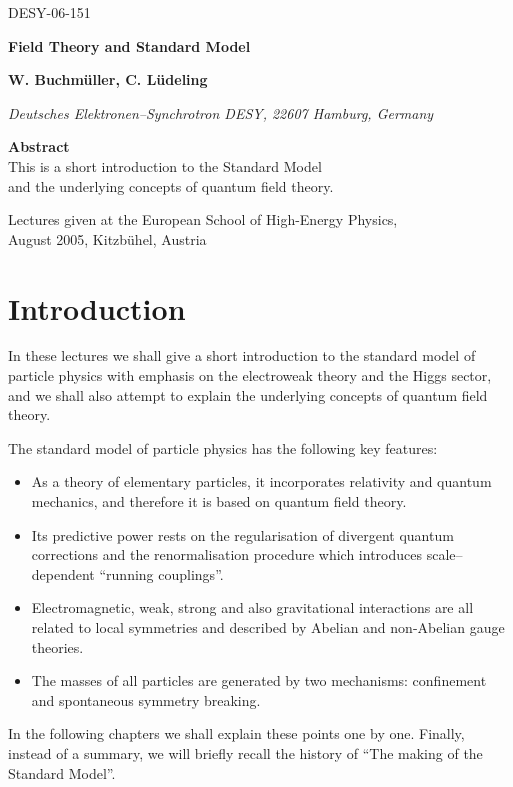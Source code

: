 \documentclass[12pt]{report}
\newcommand{\2}{\ensuremath{\sqrt{2}\,}}
\begin{document}
  \begin{titlepage}
    \hspace*{\fill}DESY-06-151

    \begin{center}
      \vspace{5cm}
      {\Huge \bfseries Field Theory and Standard Model}

      \vspace{2cm}
      {\bfseries\large W. Buchm\"{u}ller, C. L\"{u}deling}

      \vspace{1cm}
      {\it\large  Deutsches Elektronen--Synchrotron DESY, 22607 Hamburg, Germany}

      
      \vspace{2cm}
      {\bfseries Abstract}\\ 
      This is a short introduction to the Standard Model\\ 
      and the underlying concepts of quantum field theory.
 

      \vfill
      Lectures given at the European School of High-Energy Physics,\\
      August 2005, Kitzb\"{u}hel, Austria 

    \end{center}
  \end{titlepage}


  \tableofcontents

  \chapter{Introduction}
  
    In these lectures we shall give a short introduction to the standard model of particle
    physics with
    emphasis on the electroweak theory and the Higgs sector, and we shall also attempt
    to explain the underlying concepts of quantum field theory. 

    \medskip

    The standard model of particle physics has the following key features:
    \begin{itemize} 
     \item As a theory of elementary particles, it incorporates relativity and quantum mechanics, 
           and therefore it is based on quantum field theory.
     \item Its predictive power rests on the regularisation of divergent quantum corrections
           and the renormalisation procedure which introduces scale--dependent ``running couplings''.
     \item Electromagnetic, weak, strong and also gravitational interactions are all
           related to local symmetries and described by Abelian and non-Abelian gauge theories.
     \item The masses of all particles are generated by two mechanisms: confinement and spontaneous
           symmetry breaking.
    \end{itemize}
    In the following chapters we shall explain these points one by one. Finally, instead of a summary,
    we will briefly recall the history of ``The making of the Standard Model''\cite{Weinberg:2004kv}. 
\end{document}
